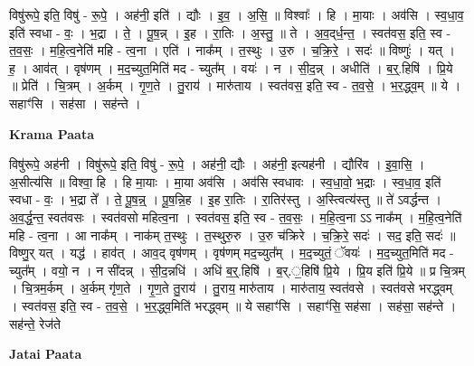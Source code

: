 \documentclass[17pt]{extarticle}
\begin{document}
विषु॑रूपे॒ इति॒ विषु॑ - रू॒पे॒ । अह॑नी॒ इति॑ । द्यौः । इ॒व॒ । अ॒सि॒ ॥ विश्वाः᳚ । हि । मा॒याः । अव॑सि । स्व॒धा॒व॒ इति॑ स्वधा - वः॒ । भ॒द्रा । ते॒ । पू॒ष॒न्न् । इ॒ह । रा॒तिः । अ॒स्तु॒ ॥ ते । अ॒व॒द्‌र्ध॒न्त॒ । स्वत॑वस॒ इति॒ स्व - त॒व॒सः॒ । म॒हि॒त्व॒नेति॑ महि - त्व॒ना । एति॑ । नाक᳚म् । त॒स्थुः । उ॒रु । च॒क्रि॒रे॒ । सदः॑ ॥ विष्णुः॑ । यत् । ह॒ । आव॑त् । वृष॑णम् । म॒द॒च्युत॒मिति॑ मद - च्युत᳚म् । वयः॑ । न । सी॒द॒न्न् । अधीति॑ । ब॒र्॒.हिषि॑ । प्रि॒ये ॥ प्रेति॑ । चि॒त्रम् । अ॒र्कम् । गृ॒ण॒ते । तु॒राय॑ । मारु॑ताय । स्वत॑वस॒ इति॒ स्व - त॒व॒से॒ । भ॒र॒द्ध्व॒म् ॥ ये । सहाꣳ॑सि । सह॑सा । सह॑न्ते ।  \newline


\textbf{Krama Paata} \newline

विषु॑रूपे॒ अह॑नी । विषु॑रूपे॒ इति॒ विषु॑ - रू॒पे॒ । अह॑नी॒ द्यौः । अह॑नी॒ इत्यह॑नी । द्यौरि॑व । इ॒वा॒सि॒ । अ॒सीत्य॑सि ॥ विश्वा॒ हि । हि मा॒याः । मा॒या अव॑सि । अव॑सि स्वधावः । स्व॒धा॒वो॒ भ॒द्राः । स्व॒धा॒व॒ इति॑ स्वधा - वः॒ । भ॒द्रा ते᳚ । ते॒ पू॒ष॒न्न्॒ । पू॒ष॒न्नि॒ह । इ॒ह रा॒तिः । रा॒तिर॑स्तु । अ॒स्त्वित्य॑स्तु ॥ ते॑ ऽवर्द्धन्त । अ॒व॒र्द्ध॒न्त॒ स्वत॑वसः । स्वत॑वसो महित्व॒ना । स्वत॑वस॒ इति॒ स्व - त॒व॒सः॒ । म॒हि॒त्व॒ना ऽऽ नाक᳚म् । म॒हि॒त्व॒नेति॑ महि - त्व॒ना । आ नाक᳚म् । नाक॑म् त॒स्थुः । त॒स्थुरु॒रु । उ॒रु च॑क्रिरे । च॒क्रि॒रे॒ सदः॑ । सद॒ इति॒ सदः॑ ॥ विष्णु॒र् यत् । यद्ध॑ । हाव॑त् । आव॒द् वृष॑णम् । वृष॑णम् मद॒च्युत᳚म् । म॒द॒च्युतं॒ ॅवयः॑ । म॒द॒च्युत॒मिति॑ मद - च्युत᳚म् । वयो॒ न । न सी॑दन्न् । सी॒द॒न्नधि॑ । अधि॑ ब॒र्॒.हिषि॑ । ब॒र्.॒हिषि॑ प्रि॒ये । प्रि॒य इति॑ प्रि॒ये ॥ प्र चि॒त्रम् । चि॒त्रम॒र्कम् । अ॒र्कम् गृ॑ण॒ते । गृ॒ण॒ते तु॒राय॑ । तु॒राय॒ मारु॑ताय । मारु॑ताय॒ स्वत॑वसे । स्वत॑वसे भरद्ध्वम् । स्वत॑वस॒ इति॒ स्व - त॒व॒से॒ । भ॒र॒द्ध्व॒मिति॑ भरद्ध्वम् ॥ ये सहाꣳ॑सि । सहाꣳ॑सि॒ सह॑सा । सह॑सा॒ सह॑न्ते । सह॑न्ते॒ रेज॑ते \newline

\textbf{Jatai Paata} \newline
\end{document}
